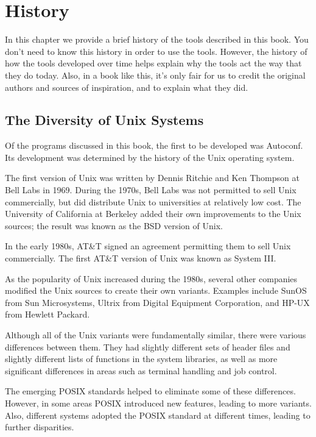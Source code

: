 \chapter{History}
In this chapter we provide a brief history of the tools described in this book. You don't need to know this history in order to use the tools. However, the history of how the tools developed over time helps explain why the tools act the way that they do today. Also, in a book like this, it's only fair for us to credit the original authors and sources of inspiration, and to explain what they did. 

\section{The Diversity of Unix Systems}


Of the programs discussed in this book, the first to be developed was Autoconf. Its development was determined by the history of the Unix operating system. 


The first version of Unix was written by Dennis Ritchie and Ken Thompson at Bell Labs in 1969. During the 1970s, Bell Labs was not permitted to sell Unix commercially, but did distribute Unix to universities at relatively low cost. The University of California at Berkeley added their own improvements to the Unix sources; the result was known as the BSD version of Unix. 


In the early 1980s, AT\&T signed an agreement permitting them to sell Unix commercially. The first AT\&T version of Unix was known as System III. 


As the popularity of Unix increased during the 1980s, several other companies modified the Unix sources to create their own variants. Examples include SunOS from Sun Microsystems, Ultrix from Digital Equipment Corporation, and HP-UX from Hewlett Packard. 


Although all of the Unix variants were fundamentally similar, there were various differences between them. They had slightly different sets of header files and slightly different lists of functions in the system libraries, as well as more significant differences in areas such as terminal handling and job control. 


The emerging POSIX standards helped to eliminate some of these differences. However, in some areas POSIX introduced new features, leading to more variants. Also, different systems adopted the POSIX standard at different times, leading to further disparities. 


